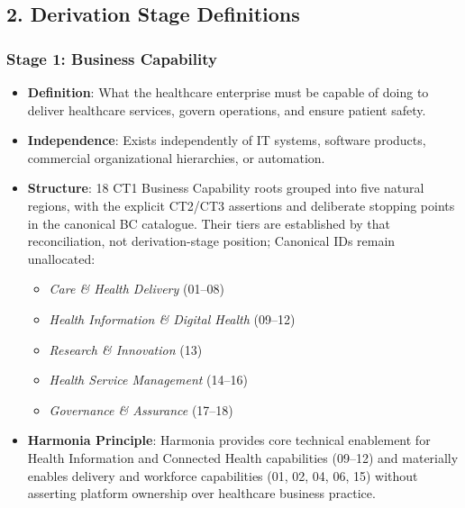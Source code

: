 \par\smallskip
{}\label{rad:tier-model:93}
\subsection*{2. Derivation Stage Definitions}
\label{rad:tier-model:95}
\subsubsection*{Stage 1: Business Capability}
\label{rad:tier-model:96}

\begin{itemize}

\item
\textbf{Definition}: What the healthcare enterprise must be capable of doing to deliver healthcare services, govern operations, and ensure patient safety.



\item
\textbf{Independence}: Exists independently of IT systems, software products, commercial organizational hierarchies, or automation.



\item
\textbf{Structure}: 18 CT1 Business Capability roots grouped into five natural regions, with the explicit CT2/\allowbreak{}CT3 assertions and deliberate stopping points in the canonical BC catalogue. Their tiers are established by that reconciliation, not derivation-stage position; Canonical IDs remain unallocated:


\begin{itemize}

\item
\emph{Care \& Health Delivery} (01–08)



\item
\emph{Health Information \& Digital Health} (09–12)



\item
\emph{Research \& Innovation} (13)



\item
\emph{Health Service Management} (14–16)



\item
\emph{Governance \& Assurance} (17–18)



\end{itemize}


\item
\textbf{Harmonia Principle}: Harmonia provides core technical enablement for Health Information and Connected Health capabilities (09–12) and materially enables delivery and workforce capabilities (01, 02, 04, 06, 15) without asserting platform ownership over healthcare business practice.



\end{itemize}
\label{rad:tier-model:106}

